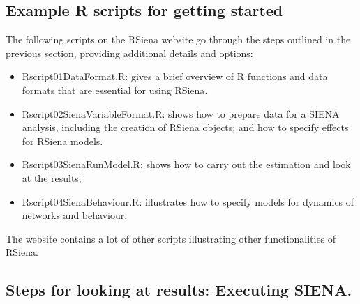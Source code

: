 \documentclass[a4paper,fleqn,11pt]{article}
\newcommand{\+}{\, + \,}
\newcommand{\sfn}[1]{\textsf{#1}}
\newcommand{\R}{{\sf R }}
\newcommand{\rs}{{\sf RSiena}}
\newcommand{\RS}{{\sf RSiena }}
\newcommand{\SI}{{\sf SIENA }}
\newcommand{\si}{{\sf SIENA}}
\begin{document}
\subsection{Example \R scripts for getting started}
\label{R_scripts}
The following scripts on the \RS website go through the steps
outlined in the previous section, providing additional details and options: \\
\begin{itemize}
	\item \sfn{Rscript01DataFormat.R}: gives a brief overview of \R functions
            and data formats that are essential for using \rs.
	\item \sfn{Rscript02SienaVariableFormat.R}: shows how to prepare data
            for a \SI analysis, including the creation of \RS objects;
            and how to specify effects for \RS models.
	\item \sfn{Rscript03SienaRunModel.R}:
           shows how to carry out the estimation and look at the results;
	\item \sfn{Rscript04SienaBehaviour.R}: illustrates
      how to specify models for dynamics of networks and behaviour.
\end{itemize}
The website contains a lot of other scripts illustrating other functionalities
of \rs.


\subsection{Steps for looking at results: Executing \si .}
\label{S_exec}
\end{document}

